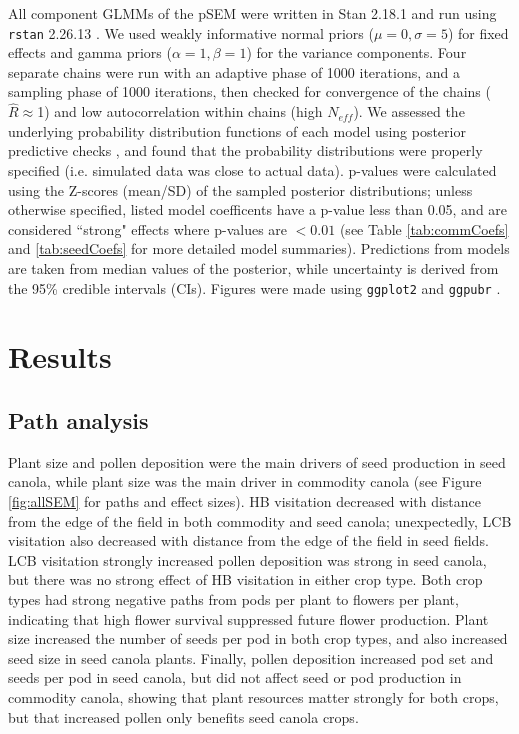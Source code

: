 \documentclass[12pt]{article} %
\begin{document}
All component GLMMs of the pSEM were written in Stan 2.18.1 and run using \texttt{rstan} 2.26.13 \citep{gelman2015,Rstan}.
We used weakly informative normal priors ($\mu=0, \sigma=5$) for fixed effects and gamma priors ($\alpha=1, \beta=1$) for the variance components.
Four separate chains were run with an adaptive phase of 1000 iterations, and a sampling phase of 1000 iterations, then checked for convergence of the chains ($\hat{R} \approx$1) and low autocorrelation within chains (high $N_{eff}$).
We assessed the underlying probability distribution functions of each model using posterior predictive checks \citep{gelman2013}, and found that the probability distributions were properly specified (i.e. simulated data was close to actual data).
p-values were calculated using the Z-scores (mean/SD) of the sampled posterior distributions; unless otherwise specified, listed model coefficents have a p-value less than 0.05, and are considered ``strong" effects where p-values are $<0.01$ (see Table \ref{tab:commCoefs} and \ref{tab:seedCoefs} for more detailed model summaries). 
Predictions from models are taken from median values of the posterior, while uncertainty is derived from the 95\% credible intervals (CIs).
Figures were made using \texttt{ggplot2} and \texttt{ggpubr} \citep{wickham2016,kassambara2020}.

\section*{Results}

\subsection*{Path analysis}

Plant size and pollen deposition were the main drivers of seed production in seed canola, while plant size was the main driver in commodity canola (see Figure \ref{fig:allSEM} for paths and effect sizes). 
HB visitation decreased with distance from the edge of the field in both commodity and seed canola; unexpectedly, LCB visitation also decreased with distance from the edge of the field in seed fields.
LCB visitation strongly increased pollen deposition was strong in seed canola, but there was no strong effect of HB visitation in either crop type.
Both crop types had strong negative paths from pods per plant to flowers per plant, indicating that high flower survival suppressed future flower production.
Plant size increased the number of seeds per pod in both crop types, and also increased seed size in seed canola plants.
Finally, pollen deposition increased pod set and seeds per pod in seed canola, but did not affect seed or pod production in commodity canola, showing that plant resources matter strongly for both crops, but that increased pollen only benefits seed canola crops.
\end{document}
